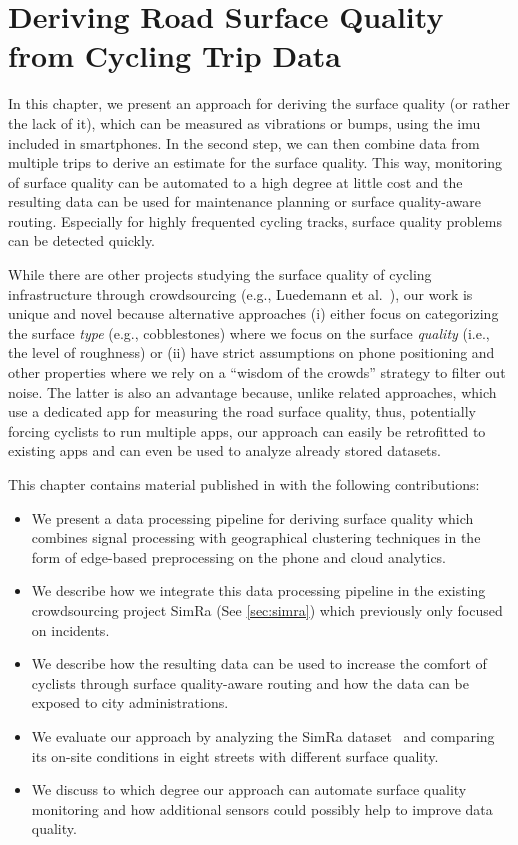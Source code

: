 \chapter{Deriving Road Surface Quality from Cycling Trip Data}
\label{cha:cyclequality}
In this chapter, we present an approach for deriving the surface quality (or rather the lack of it), which can be measured as vibrations or bumps, using the \ac{imu} included in smartphones.
In the second step, we can then combine data from multiple trips to derive an estimate for the surface quality.
This way, monitoring of surface quality can be automated to a high degree at little cost and the resulting data can be used for maintenance planning or surface quality-aware routing.
Especially for highly frequented cycling tracks, surface quality problems can be detected quickly.

While there are other projects studying the surface quality of cycling infrastructure through crowdsourcing (e.g., Luedemann et al.~\cite{luedemann2022bikevibes}), our work is unique and novel because alternative approaches (i) either focus on categorizing the surface \emph{type} (e.g., cobblestones) where we focus on the surface \emph{quality} (i.e., the level of roughness) or (ii) have strict assumptions on phone positioning and other properties where we rely on a ``wisdom of the crowds'' strategy to filter out noise.
The latter is also an advantage because, unlike related approaches, which use a dedicated app for measuring the road surface quality, thus, potentially forcing cyclists to run multiple apps, our approach can easily be retrofitted to existing apps and can even be used to analyze already stored datasets.

This chapter contains material published in \cite{karakaya2023crowdsensing} with the following contributions:
\begin{itemize}
	\item We present a data processing pipeline for deriving surface quality which combines signal processing with geographical clustering techniques in the form of edge-based preprocessing on the phone and cloud analytics.
	\item We describe how we integrate this data processing pipeline in the existing crowdsourcing project SimRa (See \ref{sec:simra}) which previously only focused on incidents.
	\item We describe how the resulting data can be used to increase the comfort of cyclists through surface quality-aware routing and how the data can be exposed to city administrations.
	\item We evaluate our approach by analyzing the SimRa dataset~\cite{dataset_simra_set1,dataset_simra_set2,dataset_simra_set3} and comparing its on-site conditions in eight streets with different surface quality.
	\item We discuss to which degree our approach can automate surface quality monitoring and how additional sensors could possibly help to improve data quality.
\end{itemize}

